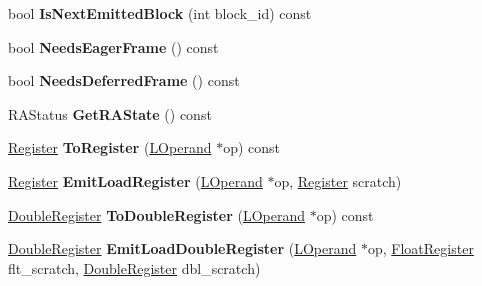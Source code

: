 \begin{DoxyCompactItemize}
\item 
bool {\bfseries Is\+Next\+Emitted\+Block} (int block\+\_\+id) const \hypertarget{classv8_1_1internal_1_1_l_code_gen_a679c74faee0e58ff843fdfa52dc927a9}{}\label{classv8_1_1internal_1_1_l_code_gen_a679c74faee0e58ff843fdfa52dc927a9}

\item 
bool {\bfseries Needs\+Eager\+Frame} () const \hypertarget{classv8_1_1internal_1_1_l_code_gen_a3487a9e332e1674eeac175bdd43851bd}{}\label{classv8_1_1internal_1_1_l_code_gen_a3487a9e332e1674eeac175bdd43851bd}

\item 
bool {\bfseries Needs\+Deferred\+Frame} () const \hypertarget{classv8_1_1internal_1_1_l_code_gen_aecf1941fcb8a169141d3e26237c64c67}{}\label{classv8_1_1internal_1_1_l_code_gen_aecf1941fcb8a169141d3e26237c64c67}

\item 
R\+A\+Status {\bfseries Get\+R\+A\+State} () const \hypertarget{classv8_1_1internal_1_1_l_code_gen_a2d87e0112246c3433fc8da4ed44f3b22}{}\label{classv8_1_1internal_1_1_l_code_gen_a2d87e0112246c3433fc8da4ed44f3b22}

\item 
\hyperlink{structv8_1_1internal_1_1_register}{Register} {\bfseries To\+Register} (\hyperlink{classv8_1_1internal_1_1_l_operand}{L\+Operand} $\ast$op) const \hypertarget{classv8_1_1internal_1_1_l_code_gen_ab3dda8b86a7b8303006365eb51069db1}{}\label{classv8_1_1internal_1_1_l_code_gen_ab3dda8b86a7b8303006365eb51069db1}

\item 
\hyperlink{structv8_1_1internal_1_1_register}{Register} {\bfseries Emit\+Load\+Register} (\hyperlink{classv8_1_1internal_1_1_l_operand}{L\+Operand} $\ast$op, \hyperlink{structv8_1_1internal_1_1_register}{Register} scratch)\hypertarget{classv8_1_1internal_1_1_l_code_gen_aae04184e582568b386844732951cdda2}{}\label{classv8_1_1internal_1_1_l_code_gen_aae04184e582568b386844732951cdda2}

\item 
\hyperlink{structv8_1_1internal_1_1_double_register}{Double\+Register} {\bfseries To\+Double\+Register} (\hyperlink{classv8_1_1internal_1_1_l_operand}{L\+Operand} $\ast$op) const \hypertarget{classv8_1_1internal_1_1_l_code_gen_aad85fae6ac6f5060e2d7b220ab87ede4}{}\label{classv8_1_1internal_1_1_l_code_gen_aad85fae6ac6f5060e2d7b220ab87ede4}

\item 
\hyperlink{structv8_1_1internal_1_1_double_register}{Double\+Register} {\bfseries Emit\+Load\+Double\+Register} (\hyperlink{classv8_1_1internal_1_1_l_operand}{L\+Operand} $\ast$op, \hyperlink{structv8_1_1internal_1_1_double_register}{Float\+Register} flt\+\_\+scratch, \hyperlink{structv8_1_1internal_1_1_double_register}{Double\+Register} dbl\+\_\+scratch)\hypertarget{classv8_1_1internal_1_1_l_code_gen_a55d837bcf3293f71a942750fd8c28022}{}\label{classv8_1_1internal_1_1_l_code_gen_a55d837bcf3293f71a942750fd8c28022}


\end{DoxyCompactItemize}

